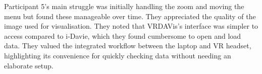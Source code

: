 Participant 5’s main struggle was initially handling the zoom and moving the menu but found these manageable over time. 
They appreciated the quality of the image used for visualisation.
They noted that VRDAVis’s interface was simpler to access compared to i-Davie, which they found cumbersome to open and load data. 
They valued the integrated workflow between the laptop and VR headset, highlighting its convenience for quickly checking data without needing an elaborate setup.








